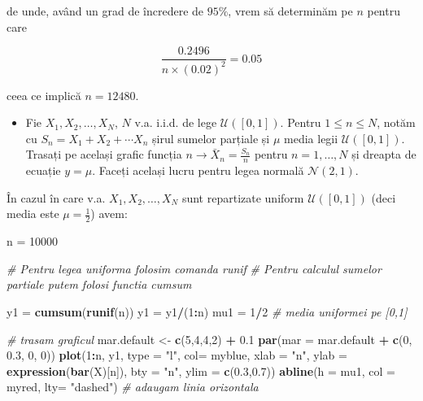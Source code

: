 \documentclass[
]{article}
\newenvironment{Shaded}{\begin{snugshade}}{\end{snugshade}}
\newcommand{\CommentTok}[1]{\textcolor[rgb]{0.56,0.35,0.01}{\textit{#1}}}
\newcommand{\DataTypeTok}[1]{\textcolor[rgb]{0.13,0.29,0.53}{#1}}
\newcommand{\DecValTok}[1]{\textcolor[rgb]{0.00,0.00,0.81}{#1}}
\newcommand{\FloatTok}[1]{\textcolor[rgb]{0.00,0.00,0.81}{#1}}
\newcommand{\KeywordTok}[1]{\textcolor[rgb]{0.13,0.29,0.53}{\textbf{#1}}}
\newcommand{\NormalTok}[1]{#1}
\newcommand{\OperatorTok}[1]{\textcolor[rgb]{0.81,0.36,0.00}{\textbf{#1}}}
\newcommand{\StringTok}[1]{\textcolor[rgb]{0.31,0.60,0.02}{#1}}
\newenvironment{frshaded*}{%
  \def\FrameCommand{\fboxrule=\FrameRule\fboxsep=\FrameSep \fcolorbox{framecolor}{shadecolor1}}%
  \MakeFramed {\advance\hsize-\width \FrameRestore}}%
{\endMakeFramed}
\newenvironment{rmdblock}[1]
  {\begin{frshaded*}
  \begin{itemize}
  \renewcommand{\labelitemi}{
    \raisebox{-.7\height}[0pt][0pt]{
      {\setkeys{Gin}{width=2em,keepaspectratio}\texttt{[image: images/icons/\#1]}}
    }
  }
  \item
  }
  {
  \end{itemize}
  \end{frshaded*}
  }
\newenvironment{rmdexercise}
  {\begin{rmdblock}{exercise}}
  {\end{rmdblock}}
\begin{document}
de unde, având un grad de încredere de \(95\%\), vrem să determinăm pe
\(n\) pentru care

\[
  \frac{0.2496}{n\times(0.02)^2} = 0.05
\]

ceea ce implică \(n = 12480\).

\begin{rmdexercise}
Fie \(X_1,X_2,\dots,X_N\), \(N\) v.a. i.i.d. de lege
\(\mathcal{U}([0,1])\). Pentru \(1\leq n\leq N\), notăm cu
\(S_n=X_1+X_2+\cdots X_n\) șirul sumelor parțiale și \(\mu\) media legii
\(\mathcal{U}([0,1])\). Trasați pe același grafic funcția
\(n\to \bar{X}_n=\frac{S_n}{n}\) pentru \(n=1,\dots,N\) și dreapta de
ecuație \(y=\mu\). Faceți același lucru pentru legea normală
\(\mathcal{N}(2,1)\).
\end{rmdexercise}

În cazul în care v.a. \(X_1,X_2,\dots,X_N\) sunt repartizate uniform
\(\mathcal{U}([0,1])\) (deci media este \(\mu=\frac{1}{2}\)) avem:

\begin{Shaded}
\begin{Highlighting}[]
\NormalTok{n =}\StringTok{ }\DecValTok{10000}

\CommentTok{# Pentru legea uniforma folosim comanda runif}
\CommentTok{# Pentru calculul sumelor partiale putem folosi functia cumsum}

\NormalTok{y1 =}\StringTok{ }\KeywordTok{cumsum}\NormalTok{(}\KeywordTok{runif}\NormalTok{(n))}
\NormalTok{y1 =}\StringTok{ }\NormalTok{y1}\OperatorTok{/}\NormalTok{(}\DecValTok{1}\OperatorTok{:}\NormalTok{n)}
\NormalTok{mu1 =}\StringTok{ }\DecValTok{1}\OperatorTok{/}\DecValTok{2} \CommentTok{# media uniformei pe [0,1]}

\CommentTok{# trasam graficul }
\NormalTok{mar.default <-}\StringTok{ }\KeywordTok{c}\NormalTok{(}\DecValTok{5}\NormalTok{,}\DecValTok{4}\NormalTok{,}\DecValTok{4}\NormalTok{,}\DecValTok{2}\NormalTok{) }\OperatorTok{+}\StringTok{ }\FloatTok{0.1}
\KeywordTok{par}\NormalTok{(}\DataTypeTok{mar =}\NormalTok{ mar.default }\OperatorTok{+}\StringTok{ }\KeywordTok{c}\NormalTok{(}\DecValTok{0}\NormalTok{, }\FloatTok{0.3}\NormalTok{, }\DecValTok{0}\NormalTok{, }\DecValTok{0}\NormalTok{)) }
\KeywordTok{plot}\NormalTok{(}\DecValTok{1}\OperatorTok{:}\NormalTok{n, y1, }\DataTypeTok{type =} \StringTok{"l"}\NormalTok{, }
     \DataTypeTok{col=}\NormalTok{ myblue, }\DataTypeTok{xlab =} \StringTok{"n"}\NormalTok{, }
     \DataTypeTok{ylab =} \KeywordTok{expression}\NormalTok{(}\KeywordTok{bar}\NormalTok{(X)[n]), }
     \DataTypeTok{bty =} \StringTok{"n"}\NormalTok{,}
     \DataTypeTok{ylim =} \KeywordTok{c}\NormalTok{(}\FloatTok{0.3}\NormalTok{,}\FloatTok{0.7}\NormalTok{))}
\KeywordTok{abline}\NormalTok{(}\DataTypeTok{h =}\NormalTok{ mu1, }\DataTypeTok{col =}\NormalTok{ myred, }\DataTypeTok{lty=} \StringTok{"dashed"}\NormalTok{) }\CommentTok{# adaugam linia orizontala}
\end{Highlighting}
\end{Shaded}
\end{document}
